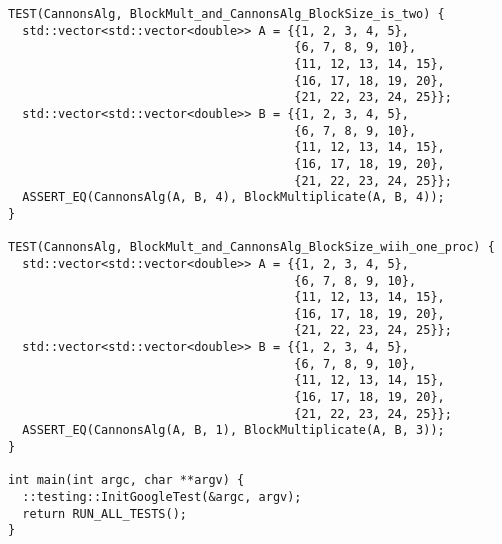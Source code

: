 \documentclass{report}
\begin{document}
\begin{lstlisting}
TEST(CannonsAlg, BlockMult_and_CannonsAlg_BlockSize_is_two) {
  std::vector<std::vector<double>> A = {{1, 2, 3, 4, 5},
                                        {6, 7, 8, 9, 10},
                                        {11, 12, 13, 14, 15},
                                        {16, 17, 18, 19, 20},
                                        {21, 22, 23, 24, 25}};
  std::vector<std::vector<double>> B = {{1, 2, 3, 4, 5},
                                        {6, 7, 8, 9, 10},
                                        {11, 12, 13, 14, 15},
                                        {16, 17, 18, 19, 20},
                                        {21, 22, 23, 24, 25}};
  ASSERT_EQ(CannonsAlg(A, B, 4), BlockMultiplicate(A, B, 4));
}

TEST(CannonsAlg, BlockMult_and_CannonsAlg_BlockSize_wiih_one_proc) {
  std::vector<std::vector<double>> A = {{1, 2, 3, 4, 5},
                                        {6, 7, 8, 9, 10},
                                        {11, 12, 13, 14, 15},
                                        {16, 17, 18, 19, 20},
                                        {21, 22, 23, 24, 25}};
  std::vector<std::vector<double>> B = {{1, 2, 3, 4, 5},
                                        {6, 7, 8, 9, 10},
                                        {11, 12, 13, 14, 15},
                                        {16, 17, 18, 19, 20},
                                        {21, 22, 23, 24, 25}};
  ASSERT_EQ(CannonsAlg(A, B, 1), BlockMultiplicate(A, B, 3));
}

int main(int argc, char **argv) {
  ::testing::InitGoogleTest(&argc, argv);
  return RUN_ALL_TESTS();
}

\end{lstlisting}
\end{document}
